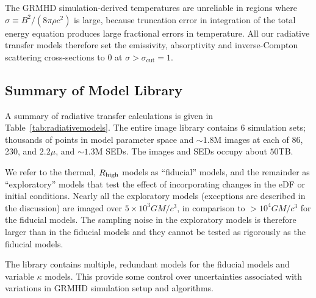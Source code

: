 The GRMHD simulation-derived temperatures are unreliable in regions where $\sigma \equiv B^2/(8\pi\rho c^2)$ is large, because truncation error in integration of the total energy equation produces large fractional errors in temperature.  All our radiative transfer models therefore set the emissivity, absorptivity and inverse-Compton scattering cross-sections to $0$ at $\sigma > \sigma_\mathrm{cut} = 1$.

\subsection{Summary of \sgra Model Library}


A summary of radiative transfer calculations is given in Table~\ref{tab:radiativemodels}. The entire image library contains $6$ simulation sets; thousands of points in model parameter space and $\sim 1.8$M images at each of 86\GHz, 230\GHz, and $2.2\mu$, and $\sim1.3$M SEDs.  The images and SEDs occupy about $50$TB.

We refer to the thermal, $R_\mathrm{high}$ models as ``fiducial'' models, and the remainder as ``exploratory'' models that test the effect of incorporating changes in the eDF or initial conditions.  Nearly all the exploratory models (exceptions are described in the discussion) are imaged over $5 \times 10^3 G M/c^3$, in comparison to $> 10^4 G M/c^3$ for the fiducial models. The sampling noise in the exploratory models is therefore larger than in the fiducial models and they cannot be tested as rigorously as the fiducial models.

The library contains multiple, redundant models for the fiducial models and variable $\kappa$ models.  This provide some control over uncertainties associated with variations in GRMHD simulation setup and algorithms.

